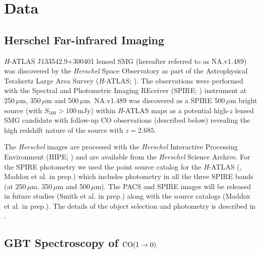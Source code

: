 \documentclass[iop,apj,useAMS,usenatbib]{emulateapj-rtx4}
\begin{document}
\section{Data}

\subsection{Herschel Far-infrared Imaging}

{\it H}-ATLAS J133542.9+300401 lensed SMG (hereafter referred to as
NA.v1.489) was discovered by the {\it Herschel} Space Observatory
\citep{Pilbratt2010} as part of the Astrophysical Terahertz
Large Area Survey ({\it H}-ATLAS; \citealp{Eales2010}). The observations
were performed with the Spectral and Photometric Imaging
REceiver (SPIRE; \citealp{Griffin2010}) instrument at 250\,$\mu$m,
350\,$\mu$m and 500\,$\mu$m. NA.v1.489 was discovered as a SPIRE
500\,$\mu$m bright source (with $S_{500}>100$\,mJy) within {\it
  H}-ATLAS maps as a potential high-$z$ lensed SMG candidate
\citep{Negrello2016} with follow-up CO observations (described below)
revealing the high redshift nature of the source with $z=2.685$.

The {\it Herschel} images are processed with the {\it Herschel} Interactive
Processing Environment (HIPE; \citealp{Ott2010}) and are available
from the {\it Herschel} Science Archive. For the SPIRE photometry we used the point source catalog for
the {\it H}-ATLAS (\citealp{Valiante2016}, Maddox et al. in prep.)
which includes photometry in all the three SPIRE bands (at 250\,$\mu$m, 350\,$\mu$m
and 500\,$\mu$m). The PACS and SPIRE images will be released in future
studies (Smith et al. in prep.) along with the source catalogs (Maddox
et al. in prep.). The details of the object selection and photometry
is described in \citep{Valiante2016}.

\subsection{GBT Spectroscopy of $\rm {CO (1 \rightarrow 0)}$}
\end{document}
